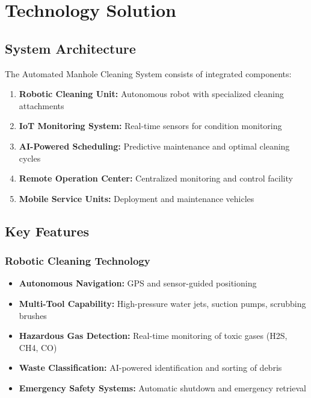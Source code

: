 \documentclass[11pt,a4paper]{article}
\begin{document}
\section{Technology Solution}

\subsection{System Architecture}
The Automated Manhole Cleaning System consists of integrated components:

\begin{enumerate}[leftmargin=2em]
    \item \textbf{Robotic Cleaning Unit:} Autonomous robot with specialized cleaning attachments
    \item \textbf{IoT Monitoring System:} Real-time sensors for condition monitoring
    \item \textbf{AI-Powered Scheduling:} Predictive maintenance and optimal cleaning cycles
    \item \textbf{Remote Operation Center:} Centralized monitoring and control facility
    \item \textbf{Mobile Service Units:} Deployment and maintenance vehicles
\end{enumerate}

\subsection{Key Features}

\subsubsection{Robotic Cleaning Technology}
\begin{itemize}[leftmargin=2em]
    \item \textbf{Autonomous Navigation:} GPS and sensor-guided positioning
    \item \textbf{Multi-Tool Capability:} High-pressure water jets, suction pumps, scrubbing brushes
    \item \textbf{Hazardous Gas Detection:} Real-time monitoring of toxic gases (H2S, CH4, CO)
    \item \textbf{Waste Classification:} AI-powered identification and sorting of debris
    \item \textbf{Emergency Safety Systems:} Automatic shutdown and emergency retrieval
\end{itemize}
\end{document}
